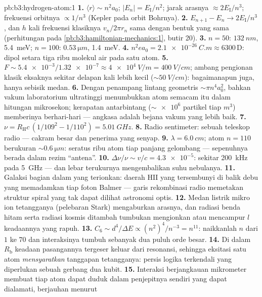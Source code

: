 \begin{solution}{pb:b3:hydrogen-atom:1}
\textbf{1.} $\langle r\rangle \sim n^2a_0$; $|E_n| =
E_{\text{I}}/n^2$; jarak arasnya $\approx 2E_{\text{I}}/n^3$; frekuensi
orbitnya $\propto 1/n^3$ (Kepler pada orbit Bohrnya).
\textbf{2.} $E_{n+1} - E_n \to 2E_{\text{I}}/n^3$, dan $h$ kali
frekuensi klasiknya $v_n/2\pi r_n$ sama dengan bentuk yang sama
(perhitungan pada \cref{pb:b3:hamiltonian-mechanics:1}, butir 20).
\textbf{3.} $n = 50$: $\qty{132}{nm}$, \qty{5.4}{meV}; $n = 100$:
$\qty{0.53}{\micro m}$, \qty{1.4}{meV}.
\textbf{4.} $n^2ea_0 = \qty{2.1e-26}{C.m} \approx 6300\,\text{D}$:
dipol setara tiga ribu molekul air pada satu atom.
\textbf{5.} $F \sim \num{5.4e-3}/\num{1.32e-7} \approx
\qty{4e4}{V/m} = \qty{400}{V/cm}$; ambang pengionan klasik eksaknya
sekitar delapan kali lebih kecil ($\sim\qty{50}{V/cm}$):
bagaimanapun juga, hanya sebisik medan.
\textbf{6.} Dengan penampang lintang geometris $\sim\pi n^4a_0^2$,
bahkan vakum laboratorium ultratinggi menumbukkan atom semacam itu dalam
hitungan mikrosekon; kerapatan antarbintang ($\sim\num{e6}$ partikel tiap
$\unit{m^3}$) memberinya berhari-hari --- angkasa adalah bejana vakum
yang lebih baik.
\textbf{7.} $\nu = R_{\text{H}}c\,(1/109^2 - 1/110^2) =
\qty{5.01}{GHz}$.
\textbf{8.} Radio sentimeter: sebuah teleskop radio --- cakram besar
dan penerima yang senyap.
\textbf{9.} $\lambda = \qty{6.0}{cm}$; atom $n = 110$ berukuran
$\sim\qty{0.6}{\micro m}$: seratus ribu atom tiap panjang gelombang ---
sepenuhnya berada dalam rezim ``antena''.
\textbf{10.} $\Delta\nu/\nu \sim v/c = \num{4.3e-5}$: sekitar
\qty{200}{kHz} pada \qty{5}{GHz} --- dan lebar terukurnya
mengembalikan suhu nebulanya.
\textbf{11.} Galaksi bagian dalam yang terionkan: daerah HII yang
tersembunyi di balik debu yang memadamkan tiap foton Balmer --- garis
rekombinasi radio memetakan struktur spiral yang tak dapat dilihat
astronomi optis.
\textbf{12.} Medan listrik mikro ion tetangganya (pelebaran Stark)
mengaburkan arasnya, dan radiasi benda hitam serta radiasi kosmis
ditambah tumbukan mengionkan atau mencampur $l$ keadaannya yang rapuh.
\textbf{13.} $C_6 \sim d^4/\Delta E \propto (n^2)^4/n^{-3} =
n^{11}$: naikkanlah $n$ dari $1$ ke $70$ dan interaksinya tumbuh
sebanyak dua puluh orde besar.
\textbf{14.} Di dalam $R_{\text{b}}$ keadaan pasangannya tergeser
keluar dari resonansi, sehingga eksitasi satu atom
\emph{mensyaratkan} tanggapan tetangganya: persis logika terkendali
yang diperlukan sebuah gerbang dua kubit.
\textbf{15.} Interaksi berjangkauan mikrometer membuat tiap atom dapat
duduk dalam penjepitnya sendiri yang dapat dialamati, berjauhan menurut

\end{solution}
